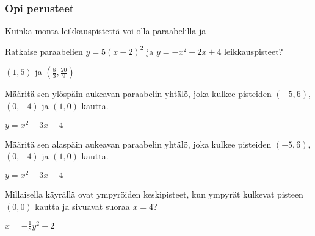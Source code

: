 \begin{tehtavasivu}

\subsubsection*{Opi perusteet}

\begin{tehtava}
    Kuinka monta leikkauspistettä voi olla paraabelilla ja
    \begin{vastaus}
    \end{vastaus}
\end{tehtava}

\begin{tehtava}
Ratkaise paraabelien $y=5(x-2)^2$  ja $y=-x^2+2x+4$ leikkauspisteet?
\begin{vastaus}
$(1, 5)$ ja $(\frac{8}{3}, \frac{20}{9})$
\end{vastaus}
\end{tehtava}

\begin{tehtava}
Määritä sen ylöspäin aukeavan paraabelin yhtälö, joka kulkee pisteiden $(-5, 6)$, $(0, -4)$ ja $(1, 0)$ kautta.
\begin{vastaus}
$y= x^2+3x-4$
\end{vastaus}
\end{tehtava}

\begin{tehtava}
Määritä sen alaspäin aukeavan paraabelin yhtälö, joka kulkee pisteiden $(-5, 6)$, $(0, -4)$ ja $(1, 0)$ kautta.
\begin{vastaus}
$y= x^2+3x-4$
\end{vastaus}
\end{tehtava}

\begin{tehtava}
Millaisella käyrällä ovat ympyröiden keskipisteet, kun ympyrät kulkevat pisteen $(0, 0)$ kautta ja sivuavat suoraa $x=4$?
\begin{vastaus}
$x=-\frac{1}{8}y^2+2$
\end{vastaus}
\end{tehtava}


\end{tehtavasivu}

